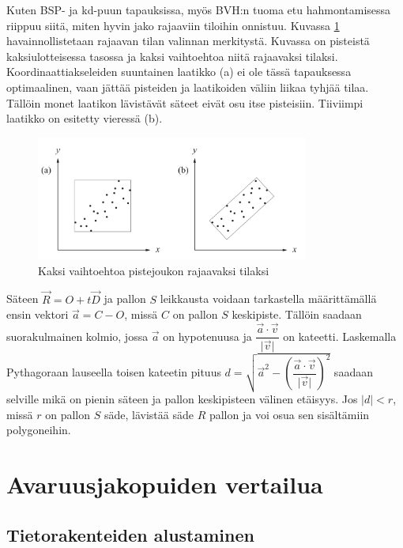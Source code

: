 \documentclass[a4paper, 12pt, titlepage]{article}
\newcommand{\abs}[1]{\vert #1 \vert} %
\begin{document}
Kuten BSP- ja kd-puun tapauksissa, myös BVH:n tuoma etu hahmontamisessa riippuu siitä, miten hyvin jako rajaaviin tiloihin onnistuu. Kuvassa \ref{bvh1} havainnollistetaan rajaavan tilan valinnan merkitystä. Kuvassa on pisteistä kaksiulotteisessa tasossa ja kaksi vaihtoehtoa niitä rajaavaksi tilaksi. Koordinaattiakseleiden suuntainen laatikko (a) ei ole tässä tapauksessa optimaalinen, vaan jättää pisteiden ja laatikoiden väliin liikaa tyhjää tilaa. Tällöin monet laatikon lävistävät säteet eivät osu itse pisteisiin. Tiiviimpi laatikko on esitetty vieressä (b).\\

\begin{figure}
 \centering 
 \includegraphics[width=0.8\textwidth]{img/bvh1.png}
 \vspace{0.4cm}
 \caption{Kaksi vaihtoehtoa pistejoukon rajaavaksi tilaksi \citep{lengyel}}%
 \vspace{-0.5cm} 
 \label{bvh1}
\end{figure}

Säteen $\vec{R}=O+t\vec{D}$ ja pallon $S$ leikkausta voidaan tarkastella määrittämällä ensin vektori $\vec{a} = C - O$, missä $C$ on pallon $S$ keskipiste. Tällöin saadaan suorakulmainen kolmio, jossa $\vec{a}$ on hypotenuusa ja $\dfrac{\vec{a}\cdot\vec{v}}{\abs{\vec{v}}}$ on kateetti. Laskemalla Pythagoraan lauseella toisen kateetin pituus $d = \sqrt{\vec{a}^2 - (\dfrac{\vec{a}\cdot\vec{v}}{\abs{\vec{v}}})^2}$ saadaan selville mikä on pienin säteen ja pallon keskipisteen välinen etäisyys. Jos $\abs{d} < r$, missä $r$ on pallon $S$ säde, lävistää säde $R$ pallon ja voi osua sen sisältämiin polygoneihin. \citep[.]{janke}    


\newpage
\section{Avaruusjakopuiden vertailua}
\subsection{Tietorakenteiden alustaminen}
\end{document}
